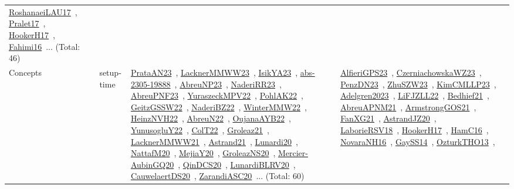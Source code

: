 {\begin{longtable}{lp{3cm}>{\raggedright\arraybackslash}p{6cm}>{\raggedright\arraybackslash}p{6cm}>{\raggedright\arraybackslash}p{8cm}}
\href{works/RoshanaeiLAU17.pdf}{RoshanaeiLAU17}~\cite{RoshanaeiLAU17}, \href{works/Pralet17.pdf}{Pralet17}~\cite{Pralet17}, \href{works/HookerH17.pdf}{HookerH17}~\cite{HookerH17}, \href{works/Fahimi16.pdf}{Fahimi16}~\cite{Fahimi16}... (Total: 46)\\
Concepts & setup-time & \href{works/PrataAN23.pdf}{PrataAN23}~\cite{PrataAN23}, \href{works/LacknerMMWW23.pdf}{LacknerMMWW23}~\cite{LacknerMMWW23}, \href{works/IsikYA23.pdf}{IsikYA23}~\cite{IsikYA23}, \href{works/abs-2305-19888.pdf}{abs-2305-19888}~\cite{abs-2305-19888}, \href{works/AbreuNP23.pdf}{AbreuNP23}~\cite{AbreuNP23}, \href{works/NaderiRR23.pdf}{NaderiRR23}~\cite{NaderiRR23}, \href{works/AbreuPNF23.pdf}{AbreuPNF23}~\cite{AbreuPNF23}, \href{works/YuraszeckMPV22.pdf}{YuraszeckMPV22}~\cite{YuraszeckMPV22}, \href{works/PohlAK22.pdf}{PohlAK22}~\cite{PohlAK22}, \href{works/GeitzGSSW22.pdf}{GeitzGSSW22}~\cite{GeitzGSSW22}, \href{works/NaderiBZ22.pdf}{NaderiBZ22}~\cite{NaderiBZ22}, \href{works/WinterMMW22.pdf}{WinterMMW22}~\cite{WinterMMW22}, \href{works/HeinzNVH22.pdf}{HeinzNVH22}~\cite{HeinzNVH22}, \href{works/AbreuN22.pdf}{AbreuN22}~\cite{AbreuN22}, \href{works/OujanaAYB22.pdf}{OujanaAYB22}~\cite{OujanaAYB22}, \href{works/YunusogluY22.pdf}{YunusogluY22}~\cite{YunusogluY22}, \href{works/ColT22.pdf}{ColT22}~\cite{ColT22}, \href{works/Groleaz21.pdf}{Groleaz21}~\cite{Groleaz21}, \href{works/LacknerMMWW21.pdf}{LacknerMMWW21}~\cite{LacknerMMWW21}, \href{works/Astrand21.pdf}{Astrand21}~\cite{Astrand21}, \href{works/Lunardi20.pdf}{Lunardi20}~\cite{Lunardi20}, \href{works/NattafM20.pdf}{NattafM20}~\cite{NattafM20}, \href{works/MejiaY20.pdf}{MejiaY20}~\cite{MejiaY20}, \href{works/GroleazNS20.pdf}{GroleazNS20}~\cite{GroleazNS20}, \href{works/Mercier-AubinGQ20.pdf}{Mercier-AubinGQ20}~\cite{Mercier-AubinGQ20}, \href{works/QinDCS20.pdf}{QinDCS20}~\cite{QinDCS20}, \href{works/LunardiBLRV20.pdf}{LunardiBLRV20}~\cite{LunardiBLRV20}, \href{works/CauwelaertDS20.pdf}{CauwelaertDS20}~\cite{CauwelaertDS20}, \href{works/ZarandiASC20.pdf}{ZarandiASC20}~\cite{ZarandiASC20}... (Total: 60) & \href{works/AlfieriGPS23.pdf}{AlfieriGPS23}~\cite{AlfieriGPS23}, \href{works/CzerniachowskaWZ23.pdf}{CzerniachowskaWZ23}~\cite{CzerniachowskaWZ23}, \href{works/PenzDN23.pdf}{PenzDN23}~\cite{PenzDN23}, \href{works/ZhuSZW23.pdf}{ZhuSZW23}~\cite{ZhuSZW23}, \href{works/KimCMLLP23.pdf}{KimCMLLP23}~\cite{KimCMLLP23}, \href{works/Adelgren2023.pdf}{Adelgren2023}~\cite{Adelgren2023}, \href{works/LiFJZLL22.pdf}{LiFJZLL22}~\cite{LiFJZLL22}, \href{works/Bedhief21.pdf}{Bedhief21}~\cite{Bedhief21}, \href{works/AbreuAPNM21.pdf}{AbreuAPNM21}~\cite{AbreuAPNM21}, \href{works/ArmstrongGOS21.pdf}{ArmstrongGOS21}~\cite{ArmstrongGOS21}, \href{works/FanXG21.pdf}{FanXG21}~\cite{FanXG21}, \href{works/AstrandJZ20.pdf}{AstrandJZ20}~\cite{AstrandJZ20}, \href{works/LaborieRSV18.pdf}{LaborieRSV18}~\cite{LaborieRSV18}, \href{works/HookerH17.pdf}{HookerH17}~\cite{HookerH17}, \href{works/HamC16.pdf}{HamC16}~\cite{HamC16}, \href{works/NovaraNH16.pdf}{NovaraNH16}~\cite{NovaraNH16}, \href{works/GaySS14.pdf}{GaySS14}~\cite{GaySS14}, \href{works/OzturkTHO13.pdf}{OzturkTHO13}~\cite{OzturkTHO13}, 
\end{longtable}}
